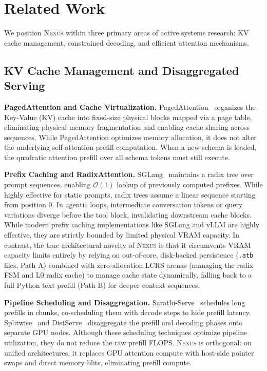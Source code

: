 \section{Related Work}
\label{sec:related-work}

We position \textsc{Nexus} within three primary areas of active systems research: KV cache management, constrained decoding, and efficient attention mechanisms.

\subsection{KV Cache Management and Disaggregated Serving}
\textbf{PagedAttention and Cache Virtualization.} PagedAttention~\cite{kwon2023vllm} organizes the Key-Value (KV) cache into fixed-size physical blocks mapped via a page table, eliminating physical memory fragmentation and enabling cache sharing across sequences. While PagedAttention optimizes memory allocation, it does not alter the underlying self-attention prefill computation. When a new schema is loaded, the quadratic attention prefill over all schema tokens must still execute. 

\textbf{Prefix Caching and RadixAttention.} SGLang~\cite{zheng2024sglang} maintains a radix tree over prompt sequences, enabling $\mathcal{O}(1)$ lookup of previously computed prefixes. While highly effective for static prompts, radix trees assume a linear sequence starting from position $0$. In agentic loops, intermediate conversation tokens or query variations diverge before the tool block, invalidating downstream cache blocks. While modern prefix caching implementations like SGLang and vLLM are highly effective, they are strictly bounded by limited physical VRAM capacity. In contrast, the true architectural novelty of \textsc{Nexus} is that it circumvents VRAM capacity limits entirely by relying on out-of-core, disk-backed persistence (\texttt{.atb} files, Path A) combined with zero-allocation LCRS arenas (managing the radix FSM and L0 radix cache) to manage cache state dynamically, falling back to a full Python text prefill (Path B) for deeper context sequences.

\textbf{Pipeline Scheduling and Disaggregation.} Sarathi-Serve~\cite{agrawal2024sarathi} schedules long prefills in chunks, co-scheduling them with decode steps to hide prefill latency. Splitwise~\cite{patel2024splitwise} and DistServe~\cite{zhong2024distserve} disaggregate the prefill and decoding phases onto separate GPU nodes. Although these scheduling techniques optimize pipeline utilization, they do not reduce the raw prefill FLOPS. \textsc{Nexus} is orthogonal: on unified architectures, it replaces GPU attention compute with host-side pointer swaps and direct memory blits, eliminating prefill compute.

